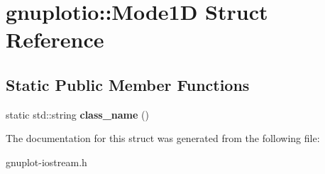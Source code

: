\hypertarget{structgnuplotio_1_1Mode1D}{}\section{gnuplotio\+:\+:Mode1D Struct Reference}
\label{structgnuplotio_1_1Mode1D}
\subsection*{Static Public Member Functions}
\begin{DoxyCompactItemize}
\item 
\mbox{\label{structgnuplotio_1_1Mode1D_a508d170d84da4dfb7cd07eebad894b8f}} 
static std\+::string {\bfseries class\+\_\+name} ()
\end{DoxyCompactItemize}


The documentation for this struct was generated from the following file\+:\begin{DoxyCompactItemize}
\item 
gnuplot-\/iostream.\+h\end{DoxyCompactItemize}

